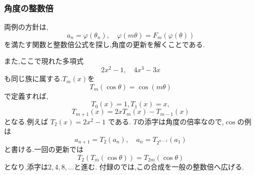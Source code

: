 \subsubsection{角度の整数倍}\label{節：角度の整数倍}
両例の方針は,
\[
  a_n=\varphi(\theta_n),
  \quad
  \varphi(m\theta)=F_m(\varphi(\theta))
\]
を満たす関数と整数倍公式を探し,角度の更新を解くことである.

また,ここで現れた多項式
\[
  2x^2-1,
  \quad
  4x^3-3x
\]
も同じ族に属する.$T_m(x)$を
\[
  T_m(\cos\theta)=\cos(m\theta)
\]
で定義すれば,
\[
  T_0(x)=1,  T_1(x)=x,
\]
\[
  T_{m+1}(x)=2xT_m(x)-T_{m-1}(x)
\]
となる.例えば $T_2(x)=2x^2-1$ である.
$T$の添字は角度の倍率なので,$\cos$の例は
\[
  a_{n+1}=T_2(a_n),
  \quad
  a_n=T_{2^{n-1}}(a_1)
\]
と書ける.一回の更新では
\[
  T_2(T_m(\cos\theta))=T_{2m}(\cos\theta)
\]
となり,添字は$2,4,8,\ldots$と進む.
付録のでは,この合成を一般の整数倍へ広げる.
